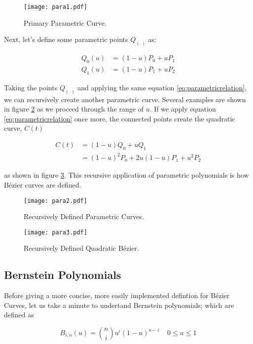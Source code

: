 \begin{figure}[htbp]
	\centering
	\texttt{[image: para1.pdf]}
	\caption{Primary Parametric Curve.}
	\label{fig:para1}
\end{figure}

Next, let's define some parametric points $Q_{(\cdot)}$ as:

\begin{align}
Q_0(u) &=  (1-u)P_0 + uP_1 \\
Q_1(u) &=  (1-u)P_1 + uP_2
 \end{align} 
 
Taking the points $Q_{(\cdot)}$ and applying the same equation \ref{eq:parametricrelation}, we can recursively create another parametric curve. Several examples are shown in figure \ref{fig:para2} as we proceed through the range of $u$. If we apply equation \ref{eq:parametricrelation} once more, the connected points create the quadratic curve, $C(t)$

\begin{align}
C(t) &= (1-u)Q_0 + uQ_1 \\
&= (1-u)^2P_0 + 2u(1-u)P_1+u^2P_2 
\end{align} 

as shown in figure \ref{fig:para3}. This recursive application of parametric polynomials is how Bézier curves are defined.
 
 \begin{figure}[htbp]
 	\centering
 	\texttt{[image: para2.pdf]}
 	\caption{Recursively Defined Parametric Curves.}
 	\label{fig:para2}
 \end{figure}

 
\begin{figure}[htbp]
	\centering
	\texttt{[image: para3.pdf]}
	\caption{Recursively Defined Quadratic Bézier.}
	\label{fig:para3}
\end{figure}


\subsection{Bernstein Polynomials}
Before giving a more concise, more easily implemented defintion for Bézier Curves, let us take a minute to undertand Bernstein polynomials; which are defined as

\begin{equation} B_{i,n}(u) = {n\choose i} u^i (1-u)^{n-i} ~~~~~0\leq u \leq1 \end{equation}

